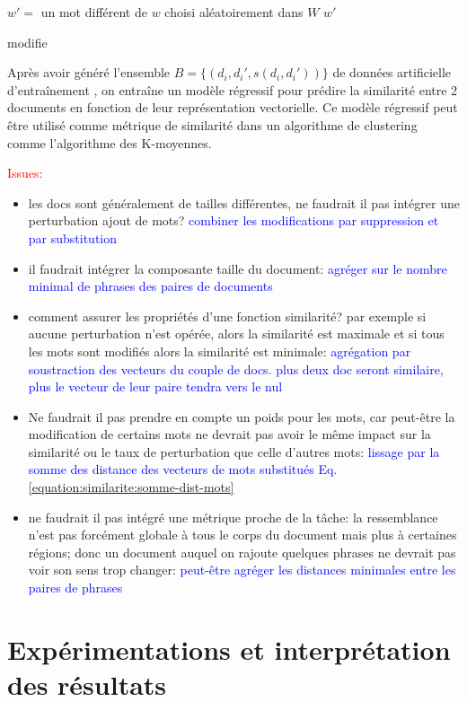 \begin{algorithm}[H]
 $w' = $ un mot différent de $w$ choisi aléatoirement dans $W$\;
 \Return $w'$
 \caption{modifie} \label{algo:similarite:modifiemot}
\end{algorithm}

Après avoir généré l'ensemble $B = \lbrace (d_i, d_i', s(d_i, d_i'))\rbrace$ de données artificielle d'entraînement , on entraîne un modèle régressif pour prédire la similarité entre 2 documents en fonction de leur représentation vectorielle. Ce modèle régressif peut être utilisé comme métrique de similarité dans un algorithme de clustering comme l'algorithme des K-moyennes.

\textcolor{red}{Issues:}
\begin{itemize}
\item les docs sont généralement de tailles différentes, ne faudrait il pas intégrer une perturbation ajout de mots? \textcolor{blue}{combiner les modifications par suppression et par substitution}
\item il faudrait intégrer la composante taille du document: \textcolor{blue}{agréger sur le nombre minimal de phrases des paires de documents}
\item comment assurer les propriétés d'une fonction similarité? par exemple si aucune perturbation n'est opérée, alors la similarité est maximale et si tous les mots sont modifiés alors la similarité est minimale: \textcolor{blue}{agrégation par soustraction des vecteurs du couple de docs. plus deux doc seront similaire, plus le vecteur de leur paire tendra vers le nul}
\item Ne faudrait il pas prendre en compte un poids pour les mots, car peut-être la modification de certains mots ne devrait pas avoir le même impact sur la similarité ou le taux de perturbation que celle d'autres mots:  \textcolor{blue}{lissage par la somme des distance des vecteurs de mots substitués Eq. \ref{equation:similarite:somme-dist-mots}}
\item ne faudrait il pas intégré une métrique proche de la tâche: la ressemblance n'est pas forcément globale à tous le corps du document mais plus à certaines régions; donc un document auquel on rajoute quelques phrases ne devrait pas voir  son sens trop changer:  \textcolor{blue}{peut-être agréger les distances minimales entre les paires de phrases}
\end{itemize}

\section{Expérimentations et interprétation des résultats}
\label{sec:similarite:experimentations}

